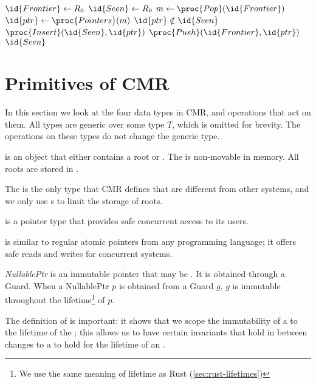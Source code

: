 \begin{codebox}
\li $\id{Frontier} \gets R_0$
\li $\id{Seen} \gets R_0$
\li \While $m \gets \proc{Pop}(\id{Frontier})$
\li   \Do \For $\id{ptr} \gets \proc{Pointers}(m)$
\li     \Do \If $\id{ptr} \notin \id{Seen}$
\li         \Do
            $\proc{Insert}(\id{Seen}, \id{ptr})$
\li	  		  $\proc{Push}(\id{Frontier}, \id{ptr})$
            \End
        \End
      \End
\li \Return $\id{Seen}$
\end{codebox}

\section{Primitives of CMR\label{sec:cmr-primitives}}

In this section we look at the four data types in CMR, and operations that act on them. All types
are generic over some type $T$, which is omitted for brevity. The operations on these types do not
change the generic type.

\begin{definition}
   is an object that either contains a root or \nullptr. The  is non-movable
  in memory. All roots are stored in .
\end{definition}

The  is the only type that CMR defines that are different from other systems, and we
only use s to limit the storage of roots.

\begin{definition}
   is a pointer type that provides safe concurrent access to its users.
\end{definition}

 is similar to regular atomic pointers from any programming language; it offers safe
reads and writes for concurrent systems.

\begin{definition}
  \emph{NullablePtr} is an immutable pointer that may be \nullptr. It is obtained through a Guard.
  When a NullablePtr $p$ is obtained from a Guard $g$, $g$ is immutable throughout the
  lifetime\footnote{We use the same meaning of lifetime as Rust (\cref{sec:rust-lifetimes})}
  of $p$.
\end{definition}

The definition of  is important: it shows that we scope the immutability of a
 to the lifetime of the ; this allows us to have certain invariants
that hold in between changes to a  to hold for the lifetime of an .

